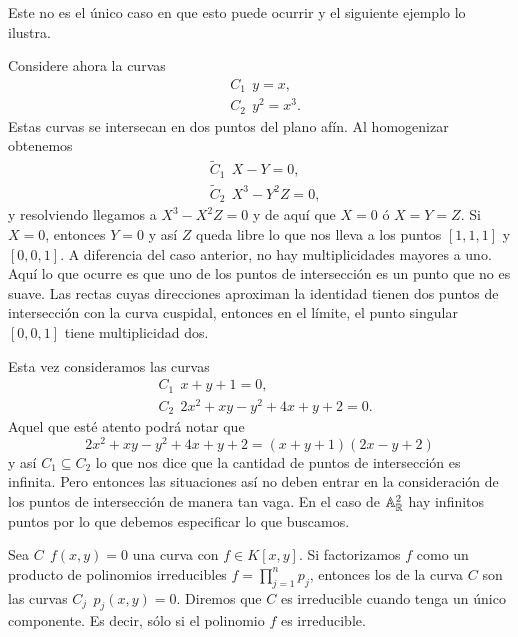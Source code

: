 \documentclass[12pt]{memoir}
\begin{document}
Este no es el único caso en que esto puede ocurrir y el siguiente ejemplo lo ilustra.

\begin{Ex}
  Considere ahora la curvas
  \begin{align*}
     & C_1\:\ y=x,\\
     & C_2\:\ y^2=x^3.
  \end{align*}
     Estas curvas se intersecan en dos puntos del plano afín. Al homogenizar obtenemos
    \begin{align*}
     & \tilde C_1\:\ X-Y=0,\\
     & \tilde C_2\:\ X^3-Y^2Z=0,
  \end{align*}
  y resolviendo llegamos a $X^3-X^2Z=0$ y de aquí que $X=0$ ó $X=Y=Z$. Si $X=0$, entonces $Y=0$ y así $Z$ queda libre lo que nos lleva a los puntos $[1,1,1]$ y $[0,0,1]$. A diferencia del caso anterior, no hay multiplicidades mayores a uno. Aquí lo que ocurre es que uno de los puntos de intersección es un punto que no es suave. Las rectas cuyas direcciones aproximan la identidad tienen dos puntos de intersección con la curva cuspidal, entonces en el límite, el punto singular $[0,0,1]$ tiene multiplicidad dos. 
\end{Ex}

\begin{Ex}
  Esta vez consideramos las curvas
  \begin{align*}
     & C_1\:\ x+y+1=0,\\
     & C_2\:\ 2x^2+xy-y^2+4x+y+2=0.
  \end{align*}
  Aquel que esté atento podrá notar que
  $$2x^2+xy-y^2+4x+y+2=(x+y+1)(2x-y+2)$$
  y así $C_1\subseteq C_2$ lo que nos dice que la cantidad de puntos de intersección es infinita. Pero entonces las situaciones así no deben entrar en la consideración de los puntos de intersección de manera tan vaga. En el caso de $\mathbb{A}^2_{\mathbb{R}}$ hay infinitos puntos por lo que debemos especificar lo que buscamos.
\end{Ex}

\begin{Def}
  Sea $C\:\ f(x,y)=0$ una curva con $f\in K[x,y]$. Si factorizamos $f$ como un producto de polinomios irreducibles $f=\prod_{j=1}^{n}p_j$, entonces los  de la curva $C$ son las curvas $C_j\:\ p_j(x,y)=0$. Diremos que $C$ es irreducible cuando tenga un único componente. Es decir, sólo si el polinomio $f$ es irreducible.
\end{Def}
\end{document}
